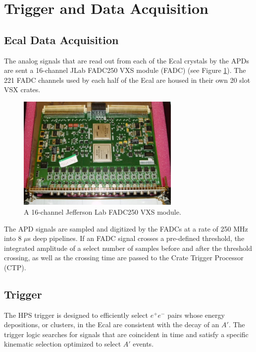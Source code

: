 \section{Trigger and Data Acquisition}

\subsection{Ecal Data Acquisition}

The analog signals that are read out from each of the Ecal crystals by the APDs
are sent a 16-channel JLab FADC250 VXS module (FADC)
(see Figure \ref{fig:ecal_fadc}).  The 221 FADC channels used by each half of 
the Ecal are housed in their own 20 slot VSX crates.
\begin{figure}
    \centering
    \includegraphics[width=0.7\textwidth]{images/ecal_fadc.png}
    \caption{A 16-channel Jefferson Lab FADC250 VXS module.}
    \label{fig:ecal_fadc}
\end{figure}

The APD signals are sampled and digitized by the FADCs at a rate of 250 MHz
into 8 $\mu$s deep pipelines.  If an FADC signal crosses a pre-defined
threshold, the integrated amplitude of a select number of samples before and
after the threshold crossing, as well as the crossing time are passed to the
Crate Trigger Processor (CTP).

\subsection{Trigger}

The HPS trigger is designed to efficiently select $e^+e^-$ pairs whose energy
depositions, or clusters, in the Ecal are consistent with 
the decay of an $A'$. The trigger logic searches for signals that
are coincident in time and satisfy a specific kinematic selection optimized
to select $A'$ events.

